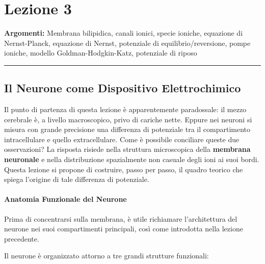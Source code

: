 \chapter{Lezione 3}

\textbf{Argomenti:} Membrana bilipidica, canali ionici, specie ioniche, equazione di Nernst-Planck, equazione di Nernst, potenziale di equilibrio/reversione, pompe ioniche, modello Goldman-Hodgkin-Katz, potenziale di riposo

\vspace{0.5cm}
\noindent\rule{\textwidth}{0.4pt}

\section{Il Neurone come Dispositivo Elettrochimico}


Il punto di partenza di questa lezione è apparentemente paradossale: il mezzo cerebrale è, a livello macroscopico, privo di cariche nette. Eppure nei neuroni si misura con grande precisione una differenza di potenziale tra il compartimento intracellulare e quello extracellulare. Come è possibile conciliare queste due osservazioni? La risposta risiede nella struttura microscopica della \textbf{membrana neuronale} e nella distribuzione spazialmente non casuale degli ioni ai suoi bordi. Questa lezione si propone di costruire, passo per passo, il quadro teorico che spiega l'origine di tale differenza di potenziale.

\subsubsection{Anatomia Funzionale del Neurone}

Prima di concentrarsi sulla membrana, è utile richiamare l'architettura del neurone nei suoi compartimenti principali, così come introdotta nella lezione precedente.

Il neurone è organizzato attorno a tre grandi strutture funzionali:

